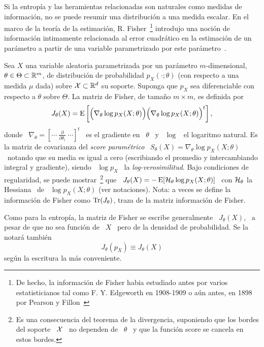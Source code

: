 \label{Ssec:SZ:Fisher}

Si la  entrop\'ia y las heramientas  relacionadas son naturales como  medidas de
informaci\'on, no se  puede resumir una distribuci\'on a una  medida escalar. En
el marco  de la teor\'ia  de la  estimaci\'on, R. Fisher~\footnote{De  hecho, la
informaci\'on de  Fisher habia  estudiado antes  por varios  estatisticianos tal
como  F.  Y. Edgeworth  en  1908-1909  o a\'un  antes,  en  1898 por  Pearson  y
Fillon~\cite{Hal06, Edg08,  PeaFil98}} introdujo  una noci\'on  de informaci\'on
intimamente  relacionada  al  error  cuadr\'atico   en  la  estimaci\'on  de  un
par\'ametro    a   partir    de    una   variable    parametrizado   por    este
par\'ametro~\cite{Fis22, Fis25:07, Kay93, LehCas08, Bos07, CovTho06, Fri04}.

\begin{definicion}
\label{Def:SZ:MatrizFisherParametrica}
%
  Sea   $X$   una   variable   aleatoria  parametrizada   por   un   par\'ametro
  $m$-dimensional,  $\theta \in  \Theta \subset  \mathbb{R}^m$, de  distribuci\'on de
  probabilidad $p_X(\cdot;\theta)$ (con respecto a  una medida $\mu$ dada) sobre
  $\mathcal{X}  \subset \mathbb{R}^d$  su soporte.  Suponga  que $p_X$  sea diferenciable  con
  respecto  a  $\theta$  sobre  $\Theta$.   La matriz  de  Fisher,  de  tama\~no
  $m \times m$, es definida por
  \[
  J_\theta(X)  =  \operatorname{E}\left[  \Big(  \nabla_\theta \log  p_X(X;\theta)  \Big)
    \Big( \nabla_\theta \log p_X(X;\theta) \Big)^t \right],
  \]
  donde \  $\nabla_\theta = \left[ \cdots  \: \frac{\partial}{\partial \theta_i}
    \: \cdots  \right]^t$ \  es el gradiente  en \  $\theta$ \ y  \ $\log$  \ el
  logaritmo natural.  Es la matriz de covarianza del {\it score param\'etrico} \
  $S_\theta(X) =  \nabla_\theta \log  p_X(X;\theta)$ \ notando  que su  media es
  igual a cero (escribiando el  promedio y intercambiando integral y gradiente),
  siendo  \  $\log p_X$  \  la  {\it  log-verosimilitud}.  Bajo  condiciones  de
  regularidad, se puede mostrar~\footnote{Es  una consecuencia del teorema de la
    divergencia, suponiendo que los bordes del soporte \ $\mathcal{X}$ \ no dependen de \
    $\theta$ \  y que  la funci\'on score  se cancela  en estos bordes.}   que \
  $J_\theta(X) =  - \operatorname{E}[\mathcal{H}_\theta \log p_X(X;\theta)]$  \ con $\mathcal{H}_\theta$
  la  Hessiana
  \ de  \ $\log  p_X(X;\theta)$ (ver  notaciones).  Nota: a  veces se  define la
  informaci\'on de  Fisher como  $\operatorname{Tr}(J_\theta)$, traza de  la matriz  informaci\'on de
  Fisher.
\end{definicion}
%
Como  para  la  entrop\'ia,  la  matriz  de Fisher  se  escribe  generalmente  \
$J_\theta(X)$, \ a pesar de que no sea  funci\'on de \ $X$ \ pero de la densidad
de  probabilidad.  Se  la  notar\'a  tambi\'en
%
\[
J_\theta(p_X) \equiv J_\theta(X)
\]
%
seg\'un la escritura la m\'as conveniente.

